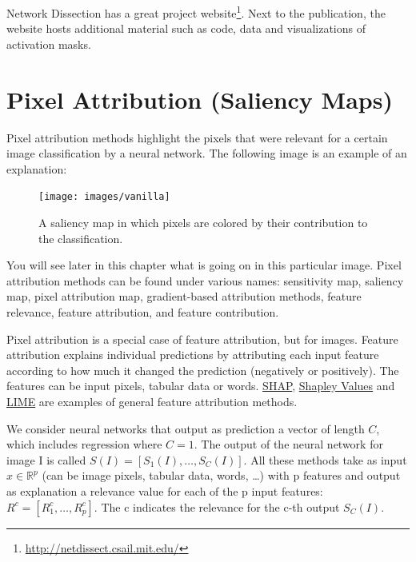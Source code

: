 \documentclass[12pt,]{krantz}
\renewcommand{\href}[2]{#2\footnote{\url{#1}}}
\begin{document}
Network Dissection has a great
\href{http://netdissect.csail.mit.edu/}{project website}. Next to the
publication, the website hosts additional material such as code, data
and visualizations of activation masks.

\newpage

\hypertarget{pixel-attribution}{\section{Pixel Attribution (Saliency
Maps)}\label{pixel-attribution}}

Pixel attribution methods highlight the pixels that were relevant for a
certain image classification by a neural network. The following image is
an example of an explanation:

\begin{figure}

{\centering \texttt{[image: images/vanilla]} 

}

\caption{A saliency map in which pixels are colored by their contribution to the classification.}\label{fig:unnamed-chunk-61}
\end{figure}

You will see later in this chapter what is going on in this particular
image. Pixel attribution methods can be found under various names:
sensitivity map, saliency map, pixel attribution map, gradient-based
attribution methods, feature relevance, feature attribution, and feature
contribution.

Pixel attribution is a special case of feature attribution, but for
images. Feature attribution explains individual predictions by
attributing each input feature according to how much it changed the
prediction (negatively or positively). The features can be input pixels,
tabular data or words. \protect\hyperlink{shap}{SHAP},
\protect\hyperlink{shapley}{Shapley Values} and
\protect\hyperlink{lime}{LIME} are examples of general feature
attribution methods.

We consider neural networks that output as prediction a vector of length
\(C\), which includes regression where \(C=1\). The output of the neural
network for image I is called \(S(I)=[S_1(I),\ldots,S_C(I)]\). All these
methods take as input \(x\in\mathbb{R}^p\) (can be image pixels, tabular
data, words, \ldots{}) with p features and output as explanation a
relevance value for each of the p input features:
\(R^c=[R_1^c,\ldots,R_p^c]\). The c indicates the relevance for the c-th
output \(S_C(I)\).
\end{document}
